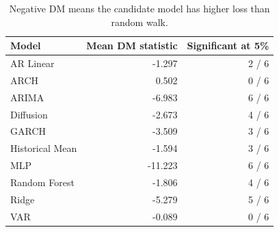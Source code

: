\begin{table}[!htbp]
\centering
\caption{Diebold-Mariano comparison versus random walk.}
\label{tab:dm-summary}
\begin{tabular}{lrr}
\toprule
Model & Mean DM statistic & Significant at 5\% \\
\midrule
AR Linear & -1.297 & 2 / 6 \\
ARCH & 0.502 & 0 / 6 \\
ARIMA & -6.983 & 6 / 6 \\
Diffusion & -2.673 & 4 / 6 \\
GARCH & -3.509 & 3 / 6 \\
Historical Mean & -1.594 & 3 / 6 \\
MLP & -11.223 & 6 / 6 \\
Random Forest & -1.806 & 4 / 6 \\
Ridge & -5.279 & 5 / 6 \\
VAR & -0.089 & 0 / 6 \\
\bottomrule
\end{tabular}
\caption*{\footnotesize Negative DM means the candidate model has higher loss than random walk.}
\end{table}
